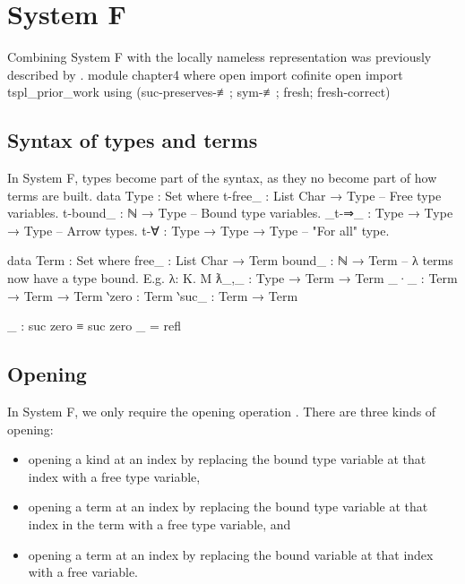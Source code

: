 \documentclass[logo,bsc,singlespacing,parskip,online]{infthesis}
\renewenvironment{code}{\mintedcopy[breaklines,breaksymbolleft=\;]{agda}}{\endmintedcopy}
\begin{document}
\chapter{System F}
Combining System F with the locally nameless representation was previously described by \citet{chargueraud_locally_2012}.
\begin{code}
module chapter4 where
  open import cofinite
  open import tspl_prior_work
    using (suc-preserves-≢; sym-≢; fresh; fresh-correct)
\end{code}

\section{Syntax of types and terms}
In System F, types become part of the syntax, as they no become part of how terms are built.
\begin{code}
  data Type : Set where
    t-free_  : List Char → Type   -- Free type variables.
    t-bound_ : ℕ → Type           -- Bound type variables.
    _t-⇒_    : Type → Type → Type -- Arrow types.
    t-∀      : Type → Type → Type -- "For all" type.

  data Term : Set where
    free_  : List Char → Term
    bound_ : ℕ → Term
    -- λ terms now have a type bound. E.g. λ: K. M
    ƛ_,_   : Type → Term → Term
    _·_    : Term → Term → Term
    ‵zero  : Term
    ‵suc_  : Term → Term

  _ : suc zero ≡ suc zero
  _ = refl
\end{code}

\section{Opening}
In System F, we only require the opening operation \citep{chargueraud_locally_2012}. There are three
kinds of opening:
\begin{itemize}
  \item opening a kind at an index by replacing the bound type variable at that index with a free
        type variable,
  \item opening a term at an index by replacing the bound type variable at that index in the term
        with a free type variable, and
  \item opening a term at an index by replacing the bound variable at that index with a free
        variable.
\end{itemize}
\end{document}
